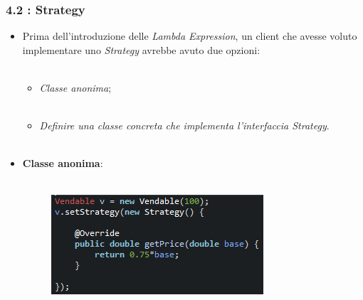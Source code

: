 \documentclass{beamer}
\begin{document}
\begin{frame}[fragile]
	\frametitle{\textbf{4.2 : Strategy}}
	\begin{itemize}
		\item
			Prima dell'introduzione delle \textit{Lambda Expression}, un client che avesse voluto implementare uno \textit{Strategy} avrebbe avuto due opzioni:\\\
			\begin{itemize}
				\item
					\textit{Classe anonima};\\\
				\item
					\textit{Definire una classe concreta che implementa l'interfaccia Strategy}.\\\
			\end{itemize}
		\item
			\textbf{Classe anonima}:\\\
			\begin{figure}
				\centering
				\includegraphics[width=0.6\linewidth]{image/strategyAnonima.png}
				\label{fig:target}
			\end{figure}
	\end{itemize}
\end{frame}

\end{document}
